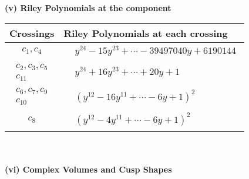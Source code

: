 \documentclass[1p]{elsarticle_modified}
\theoremstyle{definition}
\begin{document}
\newpage\renewcommand{\arraystretch}{1}
\flushleft \textbf{(v) Riley Polynomials at the component}\newline \\
\begin{tabular}{m{50pt}|m{274pt}}
Crossings & \hspace{64pt}Riley Polynomials at each crossing \\
\hline $$\begin{aligned}c_{1},c_{4}\end{aligned}$$&$\begin{aligned}
&y^{24}-15 y^{23}+\cdots-39497040 y+6190144
\end{aligned}$\\
\hline $$\begin{aligned}c_{2},c_{3},c_{5}\\c_{11}\end{aligned}$$&$\begin{aligned}
&y^{24}+16 y^{23}+\cdots+20 y+1
\end{aligned}$\\
\hline $$\begin{aligned}c_{6},c_{7},c_{9}\\c_{10}\end{aligned}$$&$\begin{aligned}
&(y^{12}-16 y^{11}+\cdots-6 y+1)^{2}
\end{aligned}$\\
\hline $$\begin{aligned}c_{8}\end{aligned}$$&$\begin{aligned}
&(y^{12}-4 y^{11}+\cdots-6 y+1)^{2}
\end{aligned}$\\
\hline
\end{tabular}\\~\\
\newpage\flushleft \textbf{(vi) Complex Volumes and Cusp Shapes}
\end{document}
